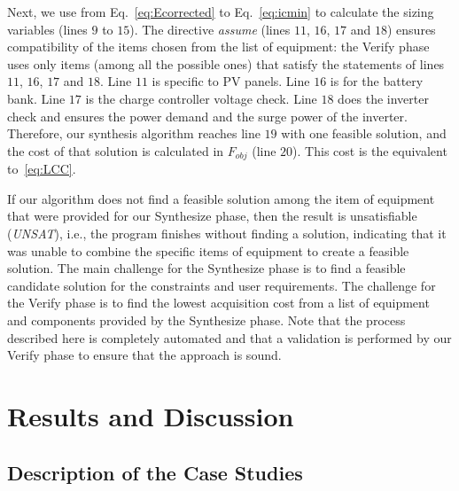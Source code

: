 \documentclass[runningheads]{llncs}
\begin{document}
Next, we use from Eq.~\eqref{eq:Ecorrected} to Eq.~\eqref{eq:icmin} to calculate the sizing variables (lines $9$ to $15$). The directive \textit{assume} (lines $11$, $16$, $17$ and $18$) ensures compatibility of the items chosen from the list of equipment: the {\sc Verify} phase uses only items (among all the possible ones) that satisfy the statements of lines $11$, $16$, $17$ and $18$. Line $11$ is specific to PV panels. Line $16$ is for the battery bank. Line $17$ is the charge controller voltage check. Line $18$ does the inverter check and ensures the power demand and the surge power of the inverter.
Therefore, our synthesis algorithm reaches line $19$ with one feasible solution, and the cost of that solution is calculated in $F_{obj}$ (line $20$). This cost is the equivalent to~\ref{eq:LCC}.

If our algorithm does not find a feasible solution among the item of equipment that were provided for our {\sc Synthesize} phase,  then the result is unsatisfiable (\textit{UNSAT}), i.e., the program finishes without finding a solution, indicating that it was unable to combine the specific items of equipment to create a feasible solution. 
%
The main challenge for the {\sc Synthesize} phase is to find a feasible candidate solution for the constraints and user requirements. The challenge for the {\sc Verify} phase is to find the lowest acquisition cost from a list of equipment and components provided by the {\sc Synthesize} phase. 
%
Note that the process described here is completely automated and that a validation is performed by our {\sc Verify} phase to ensure that the approach is sound.

\section{Results and Discussion}
\subsection{Description of the Case Studies}
\end{document}
